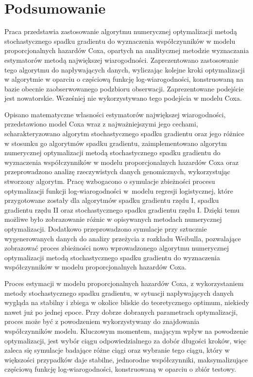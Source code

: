 \chapter*{Podsumowanie}
Praca przedstawia zastosowanie algorytmu numerycznej optymalizacji metodą stochastycznego spadku gradientu do wyznaczenia współczynników w modelu proporcjonalnych hazardów Coxa, opartych na analitycznej metodzie wyznaczania estymatorów metodą największej wiarogodności. Zaprezentowano zastosowanie tego algorytmu do napływających danych, wyliczając kolejne kroki optymalizacji w algorytmie w oparciu o częściową funkcję log-wiarogodności, konstruowaną na bazie obecnie zaobserwowanego podzbioru obserwacji. Zaprezentowane podejście jest nowatorskie. Wcześniej nie wykorzystywano tego podejścia w modelu Coxa.

Opisano matematyczne własności estymatorów największej wiarogodności, przedstawiono model Coxa wraz z najważniejszymi jego cechami, scharakteryzowano algorytm stochastycznego spadku gradientu oraz jego różnice w stosunku go algorytmów spadku gradientu, zaimplementowano algorytm numerycznej optymalizacji metodą stochastycznego spadku gradientu do wyznaczenia współczynników w modelu proporcjonalnych hazardów Coxa oraz przeprowadzono analizę rzeczywistych danych genomicznych, wykorzystując stworzony algorytm. Pracę wzbogacono o symulacje zbieżności procesu optymalizacji funkcji log-wiarogodności w~modelu regresji logistycznej, które przygotowane zostały dla algorytmów spadku gradientu rzędu I, spadku gradientu rzędu II oraz stochastycznego spadku gradientu rzędu I. Dzięki temu możliwe było zobrazowanie różnic w opisywanych metodach numerycznej optymalizacji. Dodatkowo przeprowadzono symulacje przy sztucznie wygenerowanych danych do analizy przeżycia z rozkładu Weibulla, pozwalające zobrazować proces zbieżności nowo wprowadzonego algorytmu numerycznej optymalizacji metodą stochastycznego spadku gradientu do wyznaczenia współczynników w modelu proporcjonalnych  hazardów Coxa.

Proces estymacji w modelu proporcjonalnych hazardów Coxa, z wykorzystaniem metody stochastycznego spadku gradientu, w sytuacji napływających danych wygląda na stabilny i zbiega w okolice bliskie do teoretycznego optimum, niekiedy nawet już po jednej epoce. Przy dobrze dobranych parametrach optymalizacji, proces może być z powodzeniem wykorzystywany do znajdowania współczynników modelu. Kluczowym momentem, mającym wpływ na powodzenie optymalizacji, jest wybór ciągu odpowiedzialnego za dobór długości kroków, więc zaleca się symulacje badające różne ciągi oraz wybranie tego ciągu, który w większości przypadków daje stabilne, jednorodne współczynniki, maksymalizujące częściową funkcję log-wiarogodności, konstruowaną w oparciu o zbiór testowy. 

